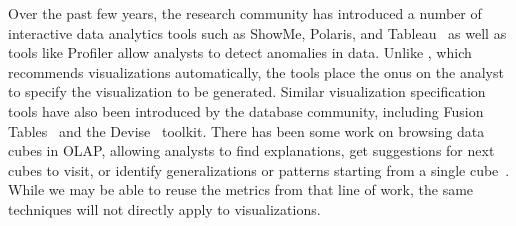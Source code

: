 

Over the past few years, the research community has introduced 
a number of interactive data analytics tools such as ShowMe, Polaris, and
Tableau~\cite{DBLP:journals/cacm/StolteTH08, DBLP:journals/tvcg/MackinlayHS07}
as well as tools like Profiler allow analysts to detect anomalies in data.
Unlike \VizRecDB, which recommends visualizations automatically, the tools place the
onus on the analyst to specify the visualization to be generated.
Similar visualization specification tools have also been introduced
by the database community, including Fusion Tables~\cite{DBLP:conf/sigmod/GonzalezHJLMSSG10} 
and the Devise~\cite{DBLP:conf/sigmod/LivnyRBCDLMW97} toolkit.
There has been some work on browsing data cubes in OLAP, allowing
analysts to find explanations, get suggestions for next cubes to visit,
or identify generalizations or patterns starting from a single cube~\cite{DBLP:conf/vldb/Sarawagi99, 
DBLP:conf/vldb/SatheS01, DBLP:conf/vldb/Sarawagi00}. 
While we may be able to reuse the metrics from that line of work,
the same techniques will not directly apply to visualizations.



